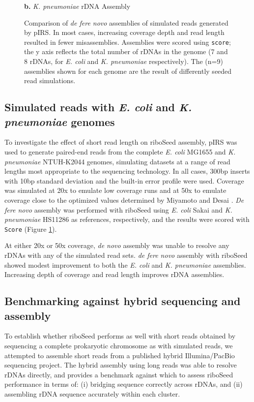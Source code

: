 \documentclass[a4,center,fleqn]{NAR}
\begin{document}
\begin{figure}[!ht]
\begin{minipage}{.45\textwidth}
    {\footnotesize \textbf{b.} \textit{K. pneumoniae} rDNA Assembly}
    \label{fig:sim_kleb}
  \end{minipage}%
  \caption{Comparison of \textit{de fere novo} assemblies of simulated reads generated by pIRS. In most cases, increasing coverage depth and read length resulted in fewer misassemblies. Assemblies were scored using \texttt{score}; the y axis reflects the total number of rDNAs in the genome (7 and 8 rDNAs, for \textit{E. coli} and \textit{K. pneumoniae} respectively). The (n=9) assemblies shown for each genome are the result of differently seeded read simulations.}
  \label{fig:simreads}
\end{figure}


\subsection*{Simulated reads with \textit{E. coli} and \textit{K. pneumoniae} genomes}

To investigate the effect of short read length on riboSeed assembly, pIRS \cite{Hu2012} was used to generate paired-end reads from the complete \textit{E. coli} MG1655 and \textit{K. pneumoniae} NTUH-K2044 genomes, simulating datasets at a range of read lengths most appropriate to the sequencing technology. In all cases, 300bp inserts with 10bp standard deviation and the built-in error profile were used. Coverage was simulated at 20x to emulate low coverage runs and at 50x to emulate coverage close to the optimized values determined by Miyamoto \cite{Miyamoto2014} and Desai \cite{Desai2013}. \textit{De fere novo} assembly was performed with riboSeed using \textit{E. coli} Sakai and \textit{K. pneumoniae} HS11286 as references, respectively, and the results were scored with \texttt{Score} (Figure \ref{fig:simreads}).


At either 20x or 50x coverage, \textit{de novo} assembly was unable to resolve any rDNAs with any of the simulated read sets. \textit{de fere novo} assembly with riboSeed showed modest improvement to both the \textit{E. coli} and \textit{K. pneumoniae} assemblies. Increasing depth of coverage and read length improves rDNA assemblies.




\subsection*{Benchmarking against hybrid sequencing and assembly}

To establish whether riboSeed performs as well with short reads obtained by sequencing a complete prokaryotic chromosome as with simulated reads, we attempted to assemble short reads from a published hybrid Illumina/PacBio sequencing project. The hybrid assembly using long reads was able to resolve rDNAs directly, and provides a benchmark against which to assess riboSeed performance in terms of: (i) bridging sequence correctly across rDNAs, and (ii) assembling rDNA sequence accurately within each cluster.
\end{document}
